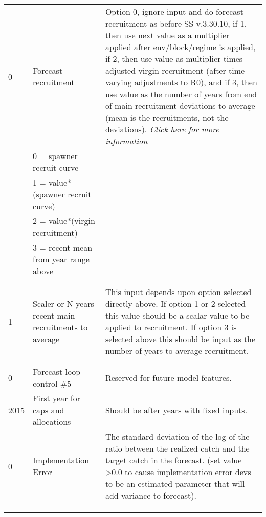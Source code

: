 \begin{landscape}
{\begin{longtable}{p{3.2cm} p{7cm} p{10.8cm}}
 \hline
 0 & Forecast recruitment & \multirow{1}{1cm}[-0.25cm]{\parbox{11cm}{Option 0, ignore input and do forecast recruitment as before SS v.3.30.10, if 1, then use next value as a multiplier applied after env/block/regime is applied, if 2, then use value as multiplier times adjusted virgin recruitment (after time-varying adjustments to R0), and if 3, then use value as the number of years from end of main recruitment deviations to average (mean is the recruitments, not the deviations).  \hyperlink{ForeSpawn}{\textit{Click here for more information}}}} \Tstrut\\
    & 0 = spawner recruit curve & \\
    & 1 = value*(spawner recruit curve) & \\
    & 2 = value*(virgin recruitment) & \\
    & 3 = recent mean from year range above & \\
    & & \\
    & & \Bstrut\\
     
 \hline
 1 & Scaler or N years recent main recruitments to average & \multirow{1}{1cm}[-0.25cm]{\parbox{11cm}{This input depends upon option selected directly above.  If option 1 or 2 selected this value should be a scalar value to be applied to recruitment. If option 3 is selected above this should be input as the number of years to average recruitment.}} \Tstrut\\
 & & \\
 & & \Bstrut\\
 
 \hline
 0 & Forecast loop control \#5 & \multirow{1}{1cm}[-0.10cm]{\parbox{11cm}{Reserved for future model features.}} \Tstrut\Bstrut\\
 
 \hline
 2015 & First year for caps and allocations & \multirow{1}{1cm}[-0.10cm]{\parbox{11cm}{Should be after years with fixed inputs.}} \Tstrut\Bstrut\\

 \pagebreak
 0 & Implementation Error & \multirow{1}{1cm}[-0.25cm]{\parbox{11cm}{The standard deviation of the log of the ratio between the realized catch and the target catch in the forecast. (set value >0.0 to cause implementation error devs to be an estimated parameter that will add variance to forecast).}} \Tstrut\\
   &   & \\
   &   & \\
   &   & \Bstrut\\
 

\end{longtable}}
\end{landscape}
